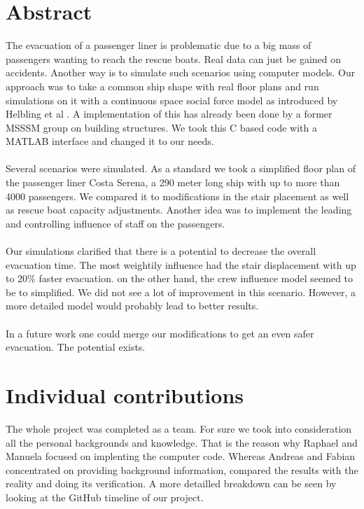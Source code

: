 \documentclass[11pt]{article}
\begin{document}
\section{Abstract}
The evacuation of a passenger liner is problematic due to a big mass of passengers wanting to reach the rescue boats. Real data can just be gained on accidents. Another way is to simulate such scenarios using computer models. Our approach was to take a common ship shape with real floor plans and run simulations on it with a continuous space social force model as introduced by Helbling et al \cite{EscapePanic}. A implementation of this has already been done by a former MSSSM group \cite{Building} on building structures. We took this C based code with a MATLAB interface and changed it to our needs. \\\\
Several scenarios were simulated. As a standard we took a simplified floor plan of the passenger liner Costa Serena, a 290 meter long ship with up to more than 4000 passengers. We compared it to modifications in the stair placement as well as rescue boat capacity adjustments. Another idea was to implement the leading and controlling influence of staff on the passengers.\\\\
Our simulations clarified that there is a potential to decrease the overall evacuation time. The most weightily influence had the stair displacement with up to 20\% faster evacuation. on the other hand, the crew influence model seemed to be to simplified. We did not see a lot of improvement in this scenario. However, a more detailed model would probably lead to better results.\\\\
In a future work one could merge our modifications to get an even safer evacuation. The potential exists.




\section{Individual contributions}
The whole project was completed as a team. For sure we took into consideration all the personal backgrounds and  knowledge. That is the reason why Raphael and Manuela focused on implenting the computer code. Whereas Andreas and Fabian concentrated on providing background information, compared the results with the reality and doing its verification. A more detailled breakdown can be seen by looking at the GitHub timeline of our project.
\end{document}

